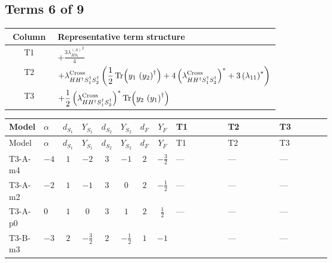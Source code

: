 \documentclass[8pt]{article}
\begin{document}
\begin{landscape}
\subsection*{Terms 6 of 9}
\begin{center}
\begin{tabular}{@{}c >{\raggedright\arraybackslash}p{0.82\linewidth}@{}}
\toprule
Column & Representative term structure \\
\midrule
T1 & \(\displaystyle +\frac{3 {\lambda_{HS_1}^{(A)}}^2}{4}\) \\
\midrule
T2 & \(\displaystyle +{\lambda_{H H^\dagger S_1^\dagger S_2^\dagger}^{\rm Cross}} \left(\frac{1}{2} \operatorname{Tr}\!\left({y_1}\,\left({y_2}\right)^{\dagger}\right)+4 \left({\lambda_{H H^\dagger S_1^\dagger S_2^\dagger}^{\rm Cross}}\right)^{*}+3 \left({\lambda_{11}}\right)^{*}\right)\) \\
\midrule
T3 & \(\displaystyle +\frac{1}{2} \left({\lambda_{H H^\dagger S_1^\dagger S_2^\dagger}^{\rm Cross}}\right)^{*} \operatorname{Tr}\!\left({y_2}\,\left({y_1}\right)^{\dagger}\right)\) \\
\midrule
\bottomrule
\end{tabular}
\end{center}
\smallskip
\tiny
\begin{longtable}{@{}llcccccc >{\raggedright\arraybackslash}p{0.21\linewidth} >{\raggedright\arraybackslash}p{0.21\linewidth} >{\raggedright\arraybackslash}p{0.21\linewidth}@{}}
\toprule
Model & $\alpha$ & $d_{S_1}$ & $Y_{S_1}$ & $d_{S_2}$ & $Y_{S_2}$ & $d_F$ & $Y_F$ & T1 & T2 & T3 \\
\midrule
\endfirsthead
\toprule
Model & $\alpha$ & $d_{S_1}$ & $Y_{S_1}$ & $d_{S_2}$ & $Y_{S_2}$ & $d_F$ & $Y_F$ & T1 & T2 & T3 \\
\midrule
\endhead
T3-A-m4 & $-4$ & $1$ & $-2$ & $3$ & $-1$ & $2$ & $-\frac{3}{2}$ & --- & --- & --- \\
\midrule
T3-A-m2 & $-2$ & $1$ & $-1$ & $3$ & $0$ & $2$ & $-\frac{1}{2}$ & --- & --- & --- \\
\midrule
T3-A-p0 & $0$ & $1$ & $0$ & $3$ & $1$ & $2$ & $\frac{1}{2}$ & --- & --- & --- \\
\midrule
T3-B-m3 & $-3$ & $2$ & $-\frac{3}{2}$ & $2$ & $-\frac{1}{2}$ & $1$ & $-1$ & \scriptsize\adjustbox{max width=\linewidth}{$\begin{gathered} +\frac{3 {\lambda_{HS_1}^{(A)}}^2}{4}\end{gathered}$} & --- & --- \\
\midrule

\end{longtable}
\end{landscape}
\end{document}
